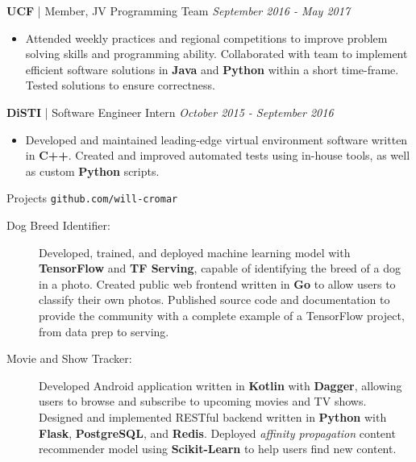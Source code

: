 \documentclass[letterpaper,11pt,oneside]{article}
\newcommand{\resheader}[2][]{
  \vspace{9pt}
  {\LARGE #2} #1
  \\
}
\newcommand{\ressubheader}[3][]{
  \vspace{6pt}
  {\large \textbf{#2} #1} \hfill \emph{#3}
  \\
}
\newcommand{\resskill}[1]{\textbf{#1}}
\begin{document}
\ressubheader[| Member, JV Programming Team]{UCF}{September 2016 - May 2017}
\begin{itemize}
  \item Attended weekly practices and regional competitions to improve problem solving skills and programming ability. Collaborated with team to implement efficient software solutions in \resskill{Java} and \resskill{Python} within a short time-frame. Tested solutions to ensure correctness.
\end{itemize}

\ressubheader[| Software Engineer Intern]{DiSTI}{October 2015 - September 2016}
\begin{itemize}
  \item Developed and maintained leading-edge virtual environment software written in \resskill{C++}. Created and improved automated tests using in-house tools, as well as custom \resskill{Python} scripts.
\end{itemize}

\resheader[\hfill \texttt{github.com/will-cromar}]{Projects}
\begin{description}
  \item [Dog Breed Identifier:] Developed, trained, and deployed machine learning model with \resskill{TensorFlow} and \resskill{TF Serving}, capable of identifying the breed of a dog in a photo. Created public web frontend written in \resskill{Go} to allow users to classify their own photos. Published source code and documentation to provide the community with a complete example of a TensorFlow project, from data prep to serving.
  \item [Movie and Show Tracker:] Developed Android application written in \resskill{Kotlin} with \resskill{Dagger}, allowing users to browse and subscribe to upcoming movies and TV shows. Designed and implemented RESTful backend written in \resskill{Python} with \resskill{Flask}, \resskill{PostgreSQL}, and \resskill{Redis}. Deployed \emph{affinity propagation} content recommender model using \resskill{Scikit-Learn} to help users find new content.
\end{description}    
\end{document}
